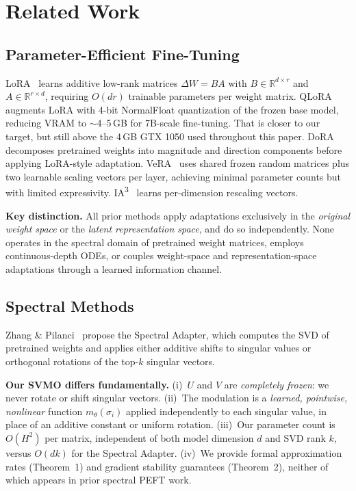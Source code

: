 \documentclass{scpe}
\newcommand{\svmo}{\textsc{SVMO}}
\newcommand{\RR}{\mathbb{R}}
\begin{document}
\section{Related Work}

\subsection{Parameter-Efficient Fine-Tuning}

LoRA~\cite{hu2021lora} learns additive low-rank matrices $\Delta W = BA$ with $B \in \RR^{d \times r}$ and $A \in \RR^{r \times d}$, requiring $O(dr)$ trainable parameters per weight matrix. QLoRA~\cite{dettmers2023qlora} augments LoRA with 4-bit NormalFloat quantization of the frozen base model, reducing VRAM to $\sim$4--5\,GB for 7B-scale fine-tuning. That is closer to our target, but still above the 4\,GB GTX 1050 used throughout this paper. DoRA~\cite{liu2024dora} decomposes pretrained weights into magnitude and direction components before applying LoRA-style adaptation. VeRA~\cite{kopiczko2024vera} uses shared frozen random matrices plus two learnable scaling vectors per layer, achieving minimal parameter counts but with limited expressivity. IA\textsuperscript{3}~\cite{liu2022ia3} learns per-dimension rescaling vectors.

\textbf{Key distinction.} All prior methods apply adaptations exclusively in the \textit{original weight space} or the \textit{latent representation space}, and do so independently. None operates in the spectral domain of pretrained weight matrices, employs continuous-depth ODEs, or couples weight-space and representation-space adaptations through a learned information channel.

\subsection{Spectral Methods}

Zhang \& Pilanci~\cite{zhang2024spectral} propose the Spectral Adapter, which computes the SVD of pretrained weights and applies either additive shifts to singular values or orthogonal rotations of the top-$k$ singular vectors.

\textbf{Our \svmo{} differs fundamentally.} (i)~$U$ and $V$ are \textit{completely frozen}: we never rotate or shift singular vectors. (ii)~The modulation is a \textit{learned, pointwise, nonlinear} function $m_\theta(\sigma_i)$ applied independently to each singular value, in place of an additive constant or uniform rotation. (iii)~Our parameter count is $O(H^2)$ per matrix, independent of both model dimension $d$ and SVD rank $k$, versus $O(dk)$ for the Spectral Adapter. (iv)~We provide formal approximation rates (Theorem~1) and gradient stability guarantees (Theorem~2), neither of which appears in prior spectral PEFT work.
\end{document}
